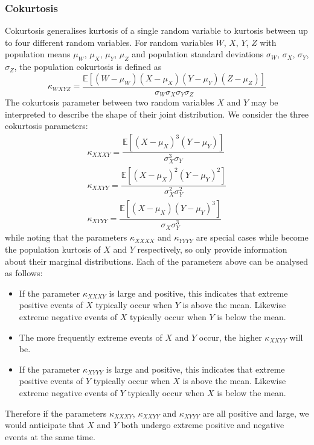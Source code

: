 \documentclass[11pt]{report} %
\begin{document}
\subsubsection{Cokurtosis}

Cokurtosis generalises kurtosis of a single random variable to kurtosis between up to four different random variables. For random variables $W$, $X$, $Y$, $Z$ with population means $\mu_{W}$, $\mu_{X}$, $\mu_{Y}$, $\mu_{Z}$ and population standard deviations $\sigma_{W}$, $\sigma_{X}$, $\sigma_{Y}$, $\sigma_{Z}$, the population cokurtosis is defined as
\begin{equation}
\kappa_{WXYZ} = \dfrac{\mathbb{E}\left[\left(W - \mu_{W}\right)\left(X - \mu_{X}\right)\left(Y - \mu_{Y}\right)\left(Z - \mu_{Z}\right)\right]}{\sigma_{W}\sigma_{X}\sigma_{Y}\sigma_{Z}}
\end{equation}
The cokurtosis parameter between two random variables $X$ and $Y$ may be interpreted to describe the shape of their joint distribution. We consider the three cokurtosis parameters:
\begin{gather}
\kappa_{XXXY} = \dfrac{\mathbb{E}\left[\left(X - \mu_{X}\right)^{3}\left(Y - \mu_{Y}\right)\right]}{\sigma_{X}^{3}\sigma_{Y}} \\
\kappa_{XXYY} = \dfrac{\mathbb{E}\left[\left(X - \mu_{X}\right)^{2}\left(Y - \mu_{Y}\right)^{2}\right]}{\sigma_{X}^{2}\sigma_{Y}^{2}} \\
\kappa_{XYYY} = \dfrac{\mathbb{E}\left[\left(X - \mu_{X}\right)\left(Y - \mu_{Y}\right)^{3}\right]}{\sigma_{X}\sigma_{Y}^{3}}
\end{gather}
while noting that the parameters $\kappa_{XXXX}$ and $\kappa_{YYYY}$ are special cases while become the population kurtosis of $X$ and $Y$ respectively, so only provide information about their marginal distributions. Each of the parameters above can be analysed as follows:
\begin{itemize}
\item If the parameter $\kappa_{XXXY}$ is large and positive, this indicates that extreme positive events of $X$ typically occur when $Y$ is above the mean. Likewise extreme negative events of $X$ typically occur when $Y$ is below the mean.
\item The more frequently extreme events of $X$ and $Y$ occur, the higher $\kappa_{XXYY}$ will be.
\item If the parameter $\kappa_{XYYY}$ is large and positive, this indicates that extreme positive events of $Y$ typically occur when $X$ is above the mean. Likewise extreme negative events of $Y$ typically occur when $X$ is below the mean.
\end{itemize}
Therefore if the parameters $\kappa_{XXXY}$, $\kappa_{XXYY}$ and $\kappa_{XYYY}$ are all positive and large, we would anticipate that $X$ and $Y$ both undergo extreme positive and negative events at the same time.
\end{document}
